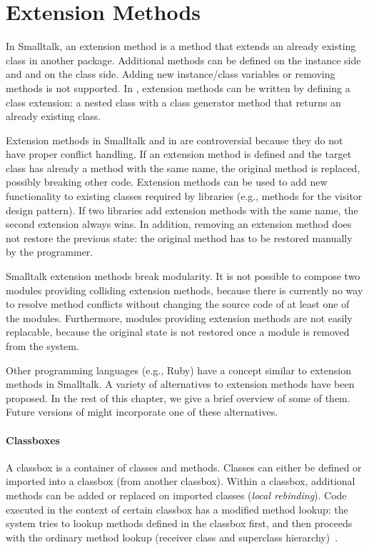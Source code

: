 \section{Extension Methods}
\label{sec:future_ext_meth}
In Smalltalk, an extension method is a method that extends an already existing class in another package. Additional methods can be defined on the instance side and and on the class side. Adding new instance/class variables or removing methods is not supported. In \msname, extension methods can be written by defining a class extension: a nested class with a class generator method that returns an already existing class.

Extension methods in Smalltalk and in \msname are controversial because they do not have proper conflict handling. If an extension method is defined and the target class has already a method with the same name, the original method is replaced, possibly breaking other code. Extension methods can be used to add new functionality to existing classes required by libraries (e.g., methods for the visitor design pattern). If two libraries add extension methods with the same name, the second extension always wins. In addition, removing an extension method does not restore the previous state: the original method has to be restored manually by the programmer.

Smalltalk extension methods break modularity. It is not possible to compose two modules providing colliding extension methods, because there is currently no way to resolve method conflicts without changing the source code of at least one of the modules. Furthermore, modules providing extension methods are not easily replacable, because the original state is not restored once a module is removed from the system.

Other programming languages (e.g., Ruby) have a concept similar to extension methods in Smalltalk. A variety of alternatives to extension methods have been proposed. In the rest of this chapter, we give a brief overview of some of them. Future versions of \msname might incorporate one of these alternatives.

\paragraph{Classboxes}
A classbox is a container of classes and methods. Classes can either be defined or imported into a classbox (from another classbox). Within a classbox, additional methods can be added or replaced on imported classes (\emph{local rebinding}). Code executed in the context of certain classbox has a modified method lookup: the system tries to lookup methods defined in the classbox first, and then proceeds with the ordinary method lookup (receiver class and superclass hierarchy)~\cite{bergel:inria-00533446}.

